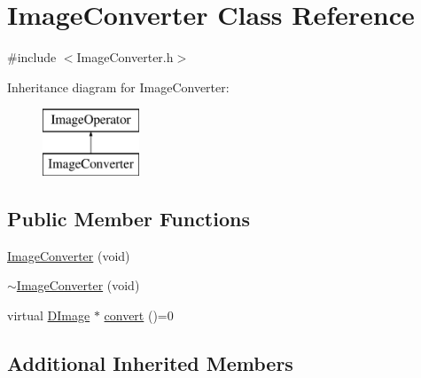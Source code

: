 \hypertarget{class_image_converter}{\section{Image\+Converter Class Reference}
\label{class_image_converter}
}


{\ttfamily \#include $<$Image\+Converter.\+h$>$}

Inheritance diagram for Image\+Converter\+:\begin{figure}[H]
\begin{center}
\leavevmode
\includegraphics[height=2.000000cm]{class_image_converter}
\end{center}
\end{figure}
\subsection*{Public Member Functions}
\begin{DoxyCompactItemize}
\item 
\hyperlink{class_image_converter_abf8ca3f9d0c1f6eb86263086bbfdd54f}{Image\+Converter} (void)
\item 
\hyperlink{class_image_converter_a2f005d8140352d4a0befbef455e35e34}{$\sim$\+Image\+Converter} (void)
\item 
virtual \hyperlink{class_d_image}{D\+Image} $\ast$ \hyperlink{class_image_converter_ae318e984b77d5db5e3c37bbfd121b9dc}{convert} ()=0
\end{DoxyCompactItemize}
\subsection*{Additional Inherited Members}


